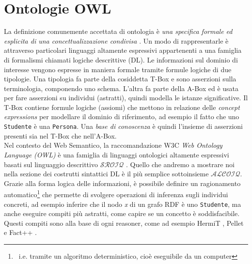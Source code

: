 \section{Ontologie OWL}
\label{sec:ontologieOWL}
La definizione comunemente accettata di ontologia è \textit{una specifica formale ed esplicita di una concettualizzazione condivisa} \cite{goy2015ontologies}. Un modo di rappresentarle è attraverso particolari linguaggi altamente espressivi appartenenti a una famiglia di formalismi chiamati logiche descrittive (DL). Le informazioni sul dominio di interesse vengono espresse in maniera formale tramite formule logiche di due tipologie. Una tipologia fa parte della cosiddetta T-Box e sono asserzioni sulla terminologia, componendo uno schema. L'altra fa parte della A-Box ed è usata per fare asserzioni su individui (astratti), quindi modella le istanze significative. Il T-Box contiene formule logiche (assiomi) che mettono in relazione delle \textit{concept expressions} per modellare il dominio di riferimento, ad esempio il fatto che  uno \texttt{Studente} è una \texttt{Persona}. Una \textit{base di conoscenza} è quindi l'insieme di asserzioni presenti sia nel T-Box che nell'A-Box.\\
Nel contesto del Web Semantico, la raccomandazione W3C \textit{Web Ontology Language (OWL)} è una famiglia di linguaggi ontologici altamente espressivi basati sul linguaggio descrittivo $\mathcal{SROIQ}$ \cite{baader2017introductionDL}. Quello che andremo a mostrare noi nella sezione dei costrutti sintattici DL è il più semplice sottoinsieme $\mathcal{ALCOIQ}$.
Grazie alla forma logica delle informazioni, è possibile definire un ragionamento automatico\footnote{\ i.e. tramite un algoritmo deterministico, cioè eseguibile da un computer} che permette di svolgere operazioni di inferenza sugli individui concreti, ad esempio inferire che il nodo \textit{x} di un grafo RDF è uno \texttt{Studente}, ma anche eseguire compiti più astratti, come capire se un concetto è soddisfacibile. Questi compiti sono alla base di ogni reasoner, come ad esempio HermiT \cite{HermiTWhitepaper}, Pellet \cite{Pellet} e Fact++ \cite{Fact++}.\\

